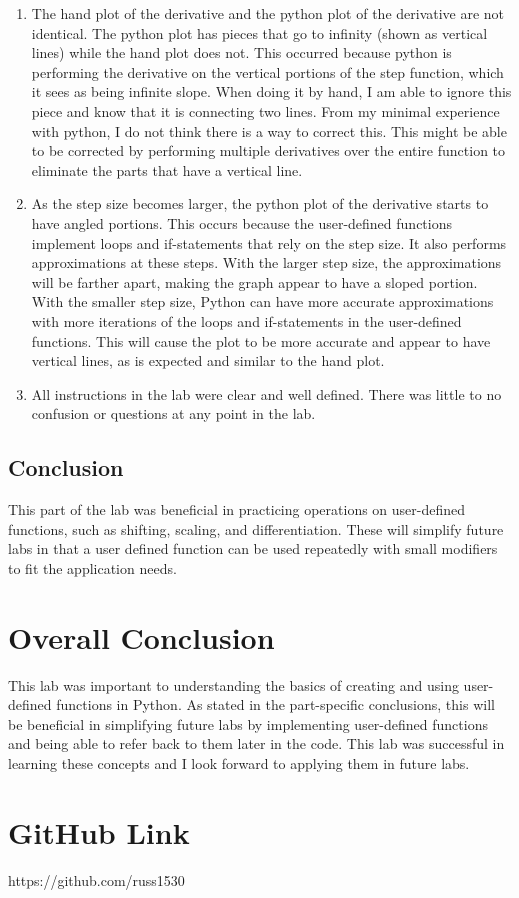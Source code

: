 \documentclass[12pt, titlepage]{article}
\begin{document}
            \begin{enumerate}
                \item The hand plot of the derivative and the python plot of the derivative are not identical.  The python plot has pieces that go to infinity (shown as vertical lines) while the hand plot does not.  This occurred because python is performing the derivative on the vertical portions of the step function, which it sees as being infinite slope.  When doing it by hand, I am able to ignore this piece and know that it is connecting two lines.  From my minimal experience with python, I do not think there is a way to correct this.  This might be able to be corrected by performing multiple derivatives over the entire function to eliminate the parts that have a vertical line.
                \item As the step size becomes larger, the python plot of the derivative starts to have angled portions.  This occurs because the user-defined functions implement loops and if-statements that rely on the step size.  It also performs approximations at these steps.  With the larger step size, the approximations will be farther apart, making the graph appear to have a sloped portion.  With the smaller step size, Python can have more accurate approximations with more iterations of the loops and if-statements in the user-defined functions.  This will cause the plot to be more accurate and appear to have vertical lines, as is expected and similar to the hand plot.
                \item  All instructions in the lab were clear and well defined.  There was little to no confusion or questions at any point in the lab.
            \end{enumerate}
            
            \subsection{Conclusion}
            This part of the lab was beneficial in practicing operations on user-defined functions, such as shifting, scaling, and differentiation.  These will simplify future labs in that a user defined function can be used repeatedly with small modifiers to fit the application needs.
            
         \section{Overall Conclusion}
        This lab was important to understanding the basics of creating and using user-defined functions in Python.  As stated in the part-specific conclusions, this will be beneficial in simplifying future labs by implementing user-defined functions and being able to refer back to them later in the code.  This lab was successful in learning these concepts and I look forward to applying them in future labs.
           
            
    
        \section{GitHub Link}
        https://github.com/russ1530
\end{document}
